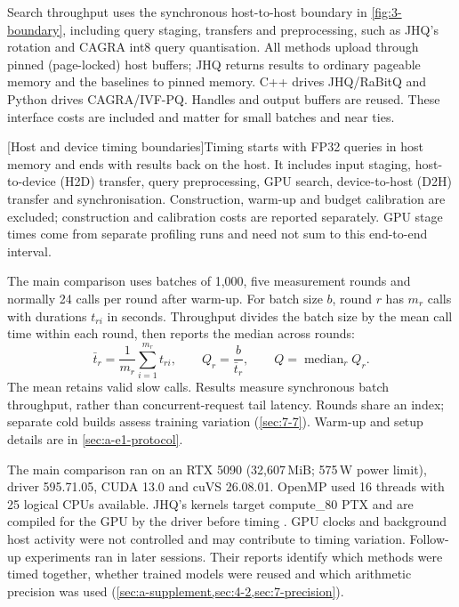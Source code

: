 Search throughput uses the synchronous host-to-host boundary in
\cref{fig:3-boundary}, including query staging, transfers and preprocessing,
such as JHQ's rotation and CAGRA int8 query quantisation. All methods
upload through pinned (page-locked) host buffers; JHQ returns results to
ordinary pageable memory and the baselines to pinned memory. C++ drives
JHQ/RaBitQ and Python drives CAGRA/IVF-PQ. Handles and output buffers
are reused. These interface costs are
included and matter for small batches and near ties.

\par\medskip\noindent\begin{minipage}{\linewidth}
\centering\captionsetup{hypcap=false}
\resizebox{\linewidth}{!}{}
[Host and device timing boundaries]{Timing starts with FP32 queries in host memory and ends with
results back on the host. It includes input staging, host-to-device (H2D)
transfer, query preprocessing, GPU search, device-to-host (D2H) transfer
and synchronisation. Construction, warm-up and budget calibration are
excluded; construction and calibration costs are reported separately.
GPU stage times come from separate profiling runs and need not sum to
this end-to-end interval.}
\label{fig:3-boundary}
\end{minipage}\par\medskip

The main comparison uses batches of 1,000, five measurement rounds and normally 24 calls
per round after warm-up. For batch size $b$, round $r$ has $m_r$ calls with
durations $t_{ri}$ in seconds. Throughput divides the batch size by the
mean call time within each round, then reports the median across rounds:
\begin{equation}
 \bar t_r=\frac1{m_r}\sum_{i=1}^{m_r}t_{ri},
 \qquad Q_r=\frac b{\bar t_r},
 \qquad Q=\operatorname{median}_r Q_r.
 \label{eq:3-throughput}
\end{equation}
The mean retains valid slow calls. Results measure synchronous batch
throughput, rather than concurrent-request tail latency. Rounds share an
index; separate cold builds assess training variation (\cref{sec:7-7}).
Warm-up and setup details are in \cref{sec:a-e1-protocol}.

The main comparison ran on an RTX 5090 (32,607\,MiB; 575\,W power limit), driver 595.71.05,
CUDA 13.0 and cuVS 26.08.01. OpenMP used 16 threads with 25 logical CPUs
available. JHQ's kernels target compute\_80 PTX and are compiled for the GPU by
the driver before timing \cite{cuda_platform}. GPU clocks and background host activity were not
controlled and may contribute to timing variation. Follow-up experiments
ran in later sessions. Their reports identify which methods were timed
together, whether trained models were reused and which arithmetic
precision was used
(\cref{sec:a-supplement,sec:4-2,sec:7-precision}).

